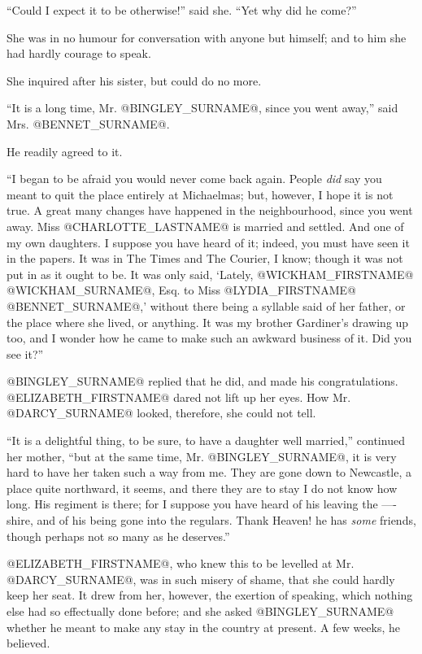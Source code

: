 ``Could I expect it to be otherwise!'' said she. ``Yet why did he come?''

She was in no humour for conversation with anyone but himself; and to
him she had hardly courage to speak.

She inquired after his sister, but could do no more.

``It is a long time, Mr. @BINGLEY_SURNAME@, since you went away,'' said Mrs. @BENNET_SURNAME@.

He readily agreed to it.

``I began to be afraid you would never come back again. People \textit{did} say
you meant to quit the place entirely at Michaelmas; but, however, I hope
it is not true. A great many changes have happened in the neighbourhood,
since you went away. Miss @CHARLOTTE_LASTNAME@ is married and settled. And one of my
own daughters. I suppose you have heard of it; indeed, you must have
seen it in the papers. It was in The Times and The Courier, I know;
though it was not put in as it ought to be. It was only said, `Lately,
@WICKHAM_FIRSTNAME@ @WICKHAM_SURNAME@, Esq. to Miss @LYDIA_FIRSTNAME@ @BENNET_SURNAME@,' without there being a
syllable said of her father, or the place where she lived, or anything.
It was my brother Gardiner's drawing up too, and I wonder how he came to
make such an awkward business of it. Did you see it?''

@BINGLEY_SURNAME@ replied that he did, and made his congratulations. @ELIZABETH_FIRSTNAME@
dared not lift up her eyes. How Mr. @DARCY_SURNAME@ looked, therefore, she could
not tell.

``It is a delightful thing, to be sure, to have a daughter well married,''
continued her mother, ``but at the same time, Mr. @BINGLEY_SURNAME@, it is very
hard to have her taken such a way from me. They are gone down to
Newcastle, a place quite northward, it seems, and there they are to stay
I do not know how long. His regiment is there; for I suppose you have
heard of his leaving the ----shire, and of his being gone into the
regulars. Thank Heaven! he has \textit{some} friends, though perhaps not so
many as he deserves.''

@ELIZABETH_FIRSTNAME@, who knew this to be levelled at Mr. @DARCY_SURNAME@, was in such
misery of shame, that she could hardly keep her seat. It drew from her,
however, the exertion of speaking, which nothing else had so effectually
done before; and she asked @BINGLEY_SURNAME@ whether he meant to make any stay in
the country at present. A few weeks, he believed.

